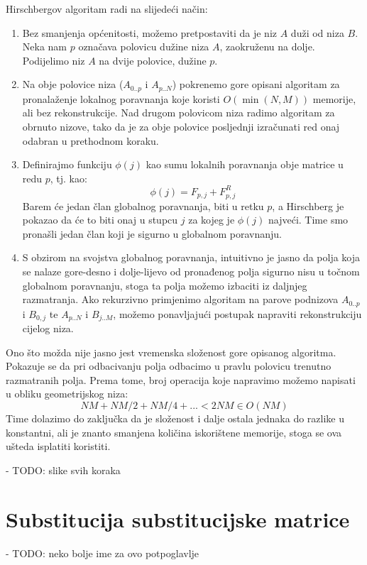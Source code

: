 \documentclass[times, utf8, zavrsni]{fer}
\begin{document}
Hirschbergov algoritam radi na slijedeći način:
\begin{enumerate}
\item
Bez smanjenja općenitosti, možemo pretpostaviti da je niz $A$ duži od
niza $B$. Neka nam $p$ označava polovicu dužine niza $A$, zaokruženu na dolje.
Podijelimo niz $A$ na dvije polovice, dužine $p$.

\item
Na obje polovice niza ($A_{0..p}$ i $A_{p..N}$) pokrenemo gore opisani algoritam
za pronalaženje
lokalnog poravnanja koje koristi $O(\min(N,M))$ memorije, ali bez
rekonstrukcije. Nad drugom polovicom niza radimo algoritam za obrnuto
nizove, tako da je za obje polovice posljednji izračunati red onaj odabran u
prethodnom koraku. 

\item
Definirajmo funkciju $\phi(j)$ kao sumu lokalnih poravnanja obje matrice u redu
$p$, tj. kao:
$$ \phi(j) = F_{p,j} + F^{R}_{p,j} $$
Barem će jedan član globalnog poravnanja, biti u retku $p$, a Hirschberg
je pokazao da će to biti onaj u stupcu $j$ za kojeg je $\phi(j)$ najveći.
Time smo pronašli jedan član koji je sigurno u globalnom poravnanju.

\item
S obzirom na svojstva globalnog poravnanja, intuitivno je jasno da
polja koja se nalaze gore-desno i dolje-lijevo od pronađenog polja 
sigurno nisu u točnom globalnom poravnanju, stoga ta polja
možemo izbaciti iz daljnjeg razmatranja. Ako rekurzivno primjenimo
algoritam na parove podnizova $A_{0..p}$ i $B_{0,j}$ te $A_{p..N}$ i
$B_{j..M}$, možemo ponavljajući postupak napraviti rekonstrukciju
cijelog niza.
\end{enumerate}

Ono što možda nije jasno jest vremenska složenost gore opisanog algoritma.
Pokazuje se da pri odbacivanju polja odbacimo u pravlu polovicu trenutno
razmatranih polja. Prema tome, broj operacija koje napravimo možemo napisati
u obliku geometrijskog niza:
$$ NM + NM/2 + NM/4 + ... < 2 NM \in O(NM) $$
Time dolazimo do zaključka da je složenost i dalje ostala jednaka do
razlike u konstantni, ali je znanto smanjena količina iskorištene
memorije, stoga se ova ušteda isplatiti koristiti.



- TODO: slike svih koraka


\section{Substitucija substitucijske matrice}
- TODO: neko bolje ime za ovo potpoglavlje
\end{document}

